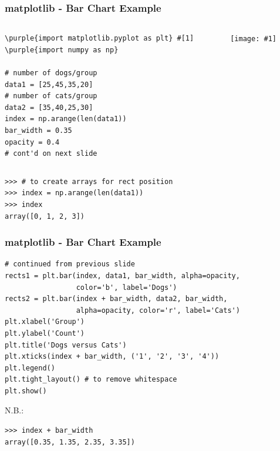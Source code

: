\documentclass[xcolor=svgnames, handout]{beamer}
\newcommand{\purple}[1]{{\textcolor{purple}{#1}}}
\newcommand{\ipic}[2]{\texttt{[image: \#1]}}
\newcommand{\ft}[1]{\frametitle{#1}}
\begin{document}
\begin{frame}[fragile]\ft{matplotlib - Bar Chart Example}

\begin{columns}[T] %
\begin{column}{.50\textwidth}

\begin{Verbatim}[xleftmargin=.1in, commandchars=\\\{\}, frame=lines ]
\purple{import matplotlib.pyplot as plt} #[1]
\purple{import numpy as np}

# number of dogs/group
data1 = [25,45,35,20]
# number of cats/group
data2 = [35,40,25,30]
index = np.arange(len(data1))
bar_width = 0.35
opacity = 0.4
# cont'd on next slide
\end{Verbatim}
\end{column}%
\hfill%
\begin{column}{.46\textwidth}
\ipic{img/catsdogs.png}{1.0}\end{column}%
\end{columns}

\begin{Verbatim}[xleftmargin=.1in, commandchars=\\\{\}, frame=single] 
>>> # to create arrays for rect position
>>> index = np.arange(len(data1))
>>> index
array([0, 1, 2, 3])
\end{Verbatim}
\end{frame}



\begin{frame}[fragile]\ft{matplotlib - Bar Chart Example}
\begin{Verbatim}[fontsize=\small, commandchars=\\\{\}, frame=single] 
# continued from previous slide
rects1 = plt.bar(index, data1, bar_width, alpha=opacity,
                 color='b', label='Dogs')
rects2 = plt.bar(index + bar_width, data2, bar_width,
                 alpha=opacity, color='r', label='Cats')
plt.xlabel('Group')
plt.ylabel('Count')
plt.title('Dogs versus Cats')
plt.xticks(index + bar_width, ('1', '2', '3', '4'))
plt.legend()
plt.tight_layout() # to remove whitespace
plt.show()
\end{Verbatim}
N.B.:
\begin{Verbatim}[frame=single]
>>> index + bar_width
array([0.35, 1.35, 2.35, 3.35])
\end{Verbatim}

\end{frame}
\end{document}
